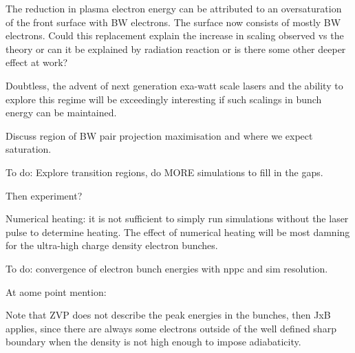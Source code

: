 The reduction in plasma electron energy can be attributed to an oversaturation of the front surface with BW electrons. The surface now consists of mostly BW electrons. Could this replacement explain the increase in scaling observed vs the theory or can it be explained by radiation reaction or is there some other deeper effect at work?

Doubtless, the advent of next generation exa-watt scale lasers and the ability to explore this regime will be exceedingly interesting if such scalings in bunch energy can be maintained.


Discuss region of BW pair projection maximisation and where we expect saturation.

To do: Explore transition regions, do MORE simulations to fill in the gaps.


Then experiment?

Numerical heating: it is not sufficient to simply run simulations without the laser pulse to determine heating. The effect of numerical heating will be most damning for the ultra-high charge density electron bunches.

To do: convergence of electron bunch energies with nppc and sim resolution.


At aome point mention:

Note that ZVP does not describe the peak energies in the bunches, then JxB applies, since there are always some electrons outside of the well defined sharp boundary when the density is not high enough to impose adiabaticity. 




